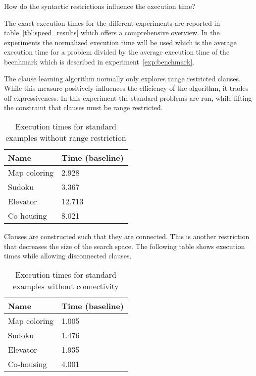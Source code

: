 \begin{question}
	How do the syntactic restrictions influence the execution time?
	\label{q:cd_speed_influence_res}
\end{question}

The exact execution times for the different experiments are reported in table~\ref{tbl:speed_results} which offers a comprehensive overview.
In the experiments the normalized execution time will be used which is the average execution time for a problem divided by the average execution time of the becnhmark which is described in experiment~\ref{exp:benchmark}.

\begin{experiment}
	The clause learning algorithm normally only explores range restricted clauses.
	While this measure positively influences the efficiency of the algorithm, it trades off expressiveness.
	In this experiment the standard problems are run, while lifting the constraint that clauses must be range restricted.

	\begin{table}[!htp]
		\begin{tabularx}{\textwidth}{XX}
		\textbf{Name} 	& \textbf{Time (baseline)} \\
		\toprule
		Map coloring 	& 2.928					\\
		Sudoku 			& 3.367					\\
		Elevator 		& 12.713				\\
		Co-housing 		& 8.021					
		\end{tabularx}
		\caption{Execution times for standard examples without range restriction}
		\label{tbl:exp_speed_no_range}
	\end{table}

\end{experiment}

\begin{experiment}
	Clauses are constructed such that they are connected.
	This is another restriction that decreases the size of the search space.
	The following table shows execution times while allowing disconnected clauses.

	\begin{table}[!htp]
		\begin{tabularx}{\textwidth}{XX}
		\textbf{Name}	& \textbf{Time (baseline)}	\\
		\toprule
		Map coloring 	& 1.005					\\
		Sudoku 			& 1.476					\\
		Elevator 		& 1.935					\\
		Co-housing 		& 4.001					
		\end{tabularx}
		\caption{Execution times for standard examples without connectivity}
		\label{tbl:exp_speed_no_connect}
	\end{table}

\end{experiment}

